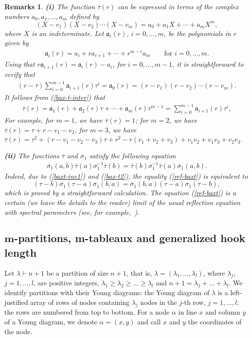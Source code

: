 \documentclass[11pt]{article}
\newcommand{\bsi}{{\overline{\sigma}}}
\newcommand{\bta}{{\overline{\tau}}}
\newtheorem*{Remarks}{Remarks}
\begin{document}
\begin{Remarks} \textbf{(i)}
The function $\bta(r)$ can be expressed in terms of the complex numbers $a_0,a_1,{\dots},a_m$ def\/ined by
\[
(X-v_1)(X-v_2)\cdots(X-v_m)=a_0+a_1X+\cdots+a_{m}X^{m}  ,
\]
where $X$ is an indeterminate.
Let $\mathfrak{a}_i(r)$, $i=0,\dots,m$, be the polynomials in $r$ given by
\begin{gather}\label{polalicl}
\mathfrak{a}_i(r)=a_i+r a_{i+1}+\cdots+r^{m-i}a_m  \qquad\textrm{for \ \ $i=0,\dots,m$.}
\end{gather}
Using that $r \mathfrak{a}_{i+1}(r)=\mathfrak{a}_{i}(r)-a_i$, for $i=0,\dots,m-1$, it is straightforward to verify that
\begin{gather}
\label{bax-t-inter}
(r-\tau)\sum_{i=0}^{m-1}\mathfrak{a}_{i+1}(r)\tau^i=\mathfrak{a}_0(r)=(r-v_1)(r-v_2)\cdots(r-v_m) .
\end{gather}
It follows from (\ref{bax-t-inter}) that
\begin{gather}\label{bax-t}
\bta(r)=\mathfrak{a}_1(r)+\mathfrak{a}_2(r)\tau+\cdots+\mathfrak{a}_{m}(r)\tau^{m-1}=\sum_{i=0}^{m-1}\mathfrak{a}_{i+1}(r)\tau^i  ,
\end{gather}
For example, for $m=1$, we have $\bta(r)=1$; for $m=2$, we have $\bta(r)=\tau+r-v_1-v_2$; for $m=3$, we have $\bta(r)=\tau^2+(r-v_1-v_2-v_3)\tau+r^2-r(v_1+v_2+v_3)+v_1v_2+v_1v_3+v_2v_3 $.


\textbf{(ii)}
The functions $\bta$ and $\bsi_1$ satisfy the following equation
\begin{gather}\label{ref-baxt}
\bsi_1(a,b)\bta(a)\sigma_1^{-1}\bta(b)=\bta(b)\sigma_1^{-1}\bta(a)\bsi_1(a,b)  .
\end{gather}
Indeed, due to (\ref{baxt-inv1}) and (\ref{bax-t2}), the equality (\ref{ref-baxt}) is equivalent to
\[
(\tau-b)\sigma_1(\tau-a)\bsi_1(b,a)=\bsi_1(b,a)(\tau-a)\sigma_1(\tau-b)  ,
\]
which is proved by a straightforward calculation.
The equation (\ref{ref-baxt}) is a certain (we leave the details to the reader) limit of the usual ref\/lection equation with spectral parameters (see, for example,~\cite{K}).
\end{Remarks}

\subsection[$m$-partitions, m-tableaux and generalized hook length]{$\boldsymbol{m}$-partitions, m-tableaux and generalized hook length}


Let $\lambda\vdash n+1$ be a partition of size $n+1$, that is, $\lambda=(\lambda_1,\dots,\lambda_l)$, where $\lambda _j$, $j=1,\dots,l$,
are positive integers, $\lambda_1\geqslant\lambda_2\geqslant\dots\geqslant\lambda_l$ and $n+1=\lambda_1+\dots+\lambda_l$.
We identify partitions with their Young diagrams: the Young diagram of $\lambda$ is a left-justif\/ied array of rows of
nodes containing $\lambda_j$ nodes in the $j$-th row, $j=1,\dots,l$; the rows are numbered from top to bottom.
For a node $\alpha$ in line $x$ and column $y$ of a Young diagram, we denote $\alpha=(x,y)$ and call $x$ and $y$ the coordinates of the node.
\end{document}
